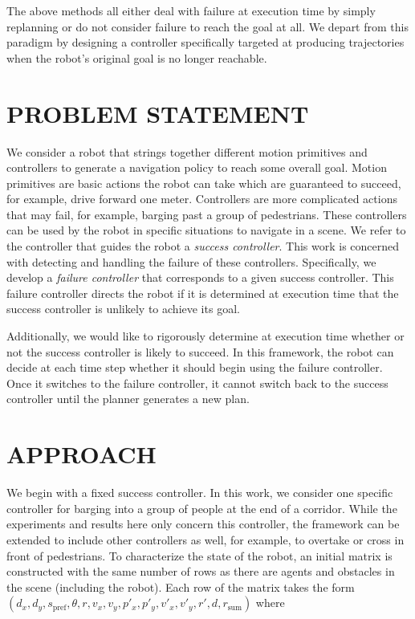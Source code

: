 \documentclass[letterpaper, 10 pt, conference]{ieeeconf}  %
\begin{document}
	The above methods all either deal with failure at execution time by simply replanning or do not consider failure to reach the goal at all. We depart from this paradigm by designing a controller specifically targeted at producing trajectories when the robot's original goal is no longer reachable.
	
\section{PROBLEM STATEMENT}\label{sec:problemstatement}
	We consider a robot that strings together different motion primitives and controllers to generate a navigation policy to reach some overall goal. Motion primitives are basic actions the robot can take which are guaranteed to succeed, for example, drive forward one meter. Controllers are more complicated actions that may fail, for example, barging past a group of pedestrians. These controllers can be used by the robot in specific situations to navigate in a scene. We refer to the controller that guides the robot a \textit{success controller}. This work is concerned with detecting and handling the failure of these controllers. Specifically, we develop a \textit{failure controller} that corresponds to a given success controller. This failure controller directs the robot if it is determined at execution time that the success controller is unlikely to achieve its goal. 
	
	Additionally, we would like to rigorously determine at execution time whether or not the success controller is likely to succeed. In this framework, the robot can decide at each time step whether it should begin using the failure controller. Once it switches to the failure controller, it cannot switch back to the success controller until the planner generates a new plan. 
		
\section{APPROACH}\label{sec:approach}
	We begin with a fixed success controller. In this work, we consider one specific controller for barging into a group of people at the end of a corridor. While the experiments and results here only concern this controller, the framework can be extended to include other controllers as well, for example, to overtake or cross in front of pedestrians. To characterize the state of the robot, an initial matrix is constructed with the same number of rows as there are agents and obstacles in the scene (including the robot). Each row of the matrix takes the form $(d_x, d_y, s_\text{pref}, \theta, r, v_x, v_y, p'_x, p'_y, v'_x, v'_y, r', d, r_\text{sum})$ where 
	
\end{document}

